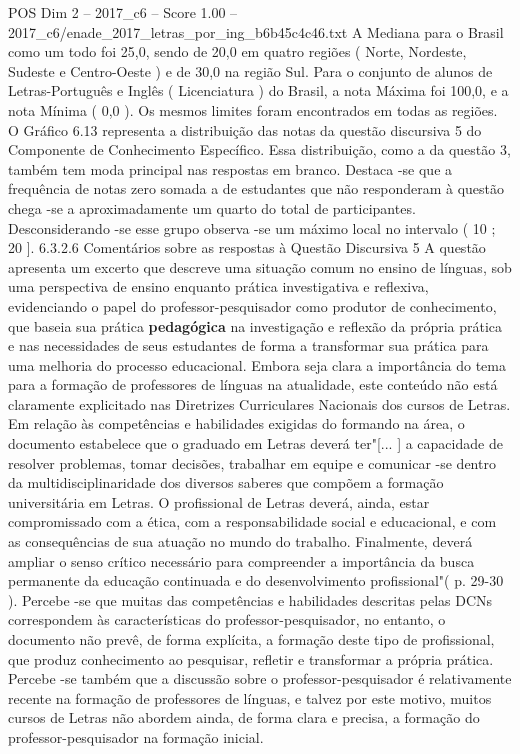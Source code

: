 \begin{textsample}{POS Dim 2 – 2017\_c6 – Score 1.00 – 2017\_c6/enade\_2017\_letras\_por\_ing\_b6b45c4c46.txt}
A Mediana para o Brasil como um todo foi 25,0, sendo de 20,0 em quatro regiões ( Norte, Nordeste, Sudeste e Centro-Oeste ) e de 30,0 na região Sul.
Para o conjunto de alunos de Letras-Português e Inglês ( Licenciatura ) do Brasil, a nota Máxima foi 100,0, e a nota Mínima ( 0,0 ).
Os mesmos limites foram encontrados em todas as regiões.
O Gráfico 6.13 representa a distribuição das notas da questão discursiva 5 do Componente de Conhecimento Específico.
Essa distribuição, como a da questão 3, também tem moda principal nas respostas em branco.
Destaca -se que a frequência de notas zero somada a de estudantes que não responderam à questão chega -se a aproximadamente um quarto do total de participantes.
Desconsiderando -se esse grupo observa -se um máximo local no intervalo ( 10 ; 20 ]. 6.3.2.6 Comentários sobre as respostas à Questão Discursiva 5 A questão apresenta um excerto que descreve uma situação comum no ensino de línguas, sob uma perspectiva de ensino enquanto prática investigativa e reflexiva, evidenciando o papel do professor-pesquisador como produtor de conhecimento, que baseia sua prática \textbf{pedagógica} na investigação e reflexão da própria prática e nas necessidades de seus estudantes de forma a transformar sua prática para uma melhoria do processo educacional.
Embora seja clara a importância do tema para a formação de professores de línguas na atualidade, este conteúdo não está claramente explicitado nas Diretrizes Curriculares Nacionais dos cursos de Letras.
Em relação às competências e habilidades exigidas do formando na área, o documento estabelece que o graduado em Letras deverá ter"[... ] a capacidade de resolver problemas, tomar decisões, trabalhar em equipe e comunicar -se dentro da multidisciplinaridade dos diversos saberes que compõem a formação universitária em Letras.
O profissional de Letras deverá, ainda, estar compromissado com a ética, com a responsabilidade social e educacional, e com as consequências de sua atuação no mundo do trabalho.
Finalmente, deverá ampliar o senso crítico necessário para compreender a importância da busca permanente da educação continuada e do desenvolvimento profissional"( p. 29-30 ).
Percebe -se que muitas das competências e habilidades descritas pelas DCNs correspondem às características do professor-pesquisador, no entanto, o documento não prevê, de forma explícita, a formação deste tipo de profissional, que produz conhecimento ao pesquisar, refletir e transformar a própria prática.
Percebe -se também que a discussão sobre o professor-pesquisador é relativamente recente na formação de professores de línguas, e talvez por este motivo, muitos cursos de Letras não abordem ainda, de forma clara e precisa, a formação do professor-pesquisador na formação inicial.

\end{textsample}
